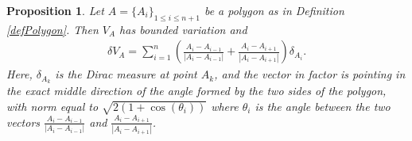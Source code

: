 \documentclass[12pt,english]{smfart} %
\newtheorem{proposition}[theorem]{Proposition}
\theoremstyle{remark}
\begin{document}
\medskip\begin{proposition}\label{propPoly}Let $A=\{A_i\}_{1\leqslant i \leqslant n+1}$ be a polygon as  in Definition \ref{defPolygon}. Then  $V_A$ has bounded variation and 
\begin{eqnarray}
\delta V_A = \sum_{i=1}^n \left(\frac{A_{i}-A_{i-1}}{|A_i-A_{i-1}|}+ \frac{A_{i}-A_{i+1}}{|A_i-A_{i+1}|}\right)\delta_{A_i}. \label{varPolygone}
\end{eqnarray}
Here, $\delta_{A_k}$ is the Dirac measure at point $A_k$, and the vector in factor is pointing in the exact middle direction of the angle formed by the two sides of the polygon, with norm equal to $\sqrt{2(1+\cos(\theta_i))}$ where $\theta_i$ is the angle between the two vectors $\frac{A_{i}-A_{i-1}}{|A_i-A_{i-1}|}$ and $\frac{A_{i}-A_{i+1}}{|A_i-A_{i+1}|}$.
\end{proposition}
\end{document}
